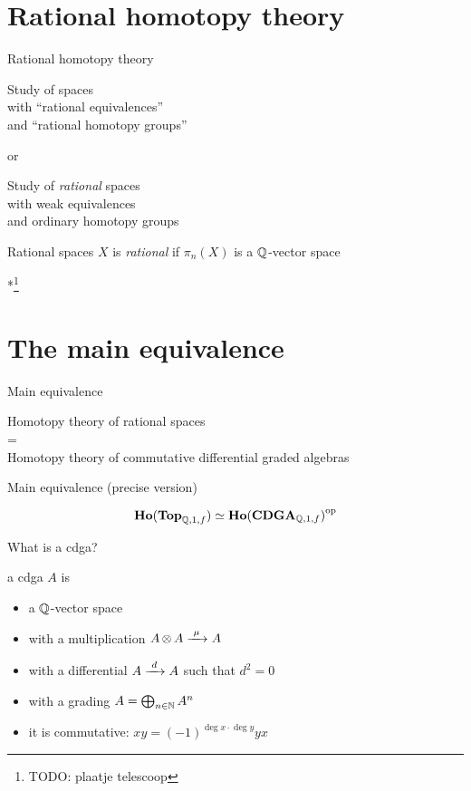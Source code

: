 \documentclass[14pt]{beamer}
\newcommand{\td}[1]{\colorbox{todocolor}{*\footnote{TODO: #1}}}
\newcommand{\Frame}[2]{
	\begin{frame}{#1}#2\end{frame}
}
\begin{document}
\section{Rational homotopy theory}
\Frame{Rational homotopy theory}{
	\begin{center}
	Study of spaces\\
	with ``rational equivalences'' \\
	and ``rational homotopy groups''

	\pause
	\bigskip
	or
	\bigskip

	Study of \emph{rational} spaces \\
	with weak equivalences \\
	and ordinary homotopy groups
	\end{center}
}

\Frame{Rational spaces}{
	$X$ is \emph{rational} if $\pi_n(X)$ is a $\mathbb{Q}$-vector space

	\bigskip
	\td{plaatje telescoop}
}


\section{The main equivalence}
\Frame{Main equivalence}{
	\begin{theorem}
	\begin{center}
		Homotopy theory of rational spaces \\
		= \\
		Homotopy theory of commutative differential graded algebras
	\end{center}
	\end{theorem}
}

\Frame{Main equivalence (precise version)}{
	\begin{theorem}
		\[ \mathbf{Ho}(\mathbf{Top}_{\mathbb{Q}, 1, f}) \simeq {\mathbf{Ho}(\mathbf{CDGA}_{\mathbb{Q}, 1, f})}^{\text{op}} \]
	\end{theorem}
}

\Frame{What is a cdga?}{
	\begin{definition}
		a cdga $A$ is
		\begin{itemize}
			\item a $\mathbb{Q}$-vector space
			\item with a multiplication $A \operatorname*{\otimes} A \xrightarrow{\,\,{\mu}\,\,} A$
			\item with a differential $A \xrightarrow{\,\,{d}\,\,} A$ such that $d^2 = 0$
			\item with a grading $A = \bigoplus_{n \in \mathbb{N}} A^n$
			\item it is commutative: $ x y = (-1)^{\deg{x}\cdot\deg{y}} y x $
		\end{itemize}
	\end{definition}
}
\end{document}
